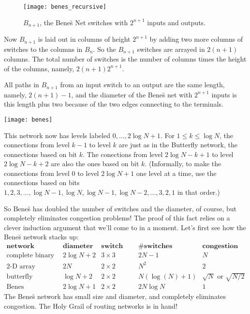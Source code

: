 \begin{figure}
\texttt{[image: benes\_recursive]}
\caption{$B_{n+1}$, the Bene\u{s} Net switches with $2^{n+1}$ inputs
and outputs.}
\label{fig:benes-recursive}
\end{figure}

Now $B_{n+1}$ is laid out in columns of height $2^{n+1}$ by adding two
more columns of switches to the columns in $B_n$.  So the $B_{n+1}$
switches are arrayed in $2(n+1)$ columns.  The total number of
switches is the number of columns times the height of the columns,
namely, $2(n+1)2^{n+1}$.

All paths in $B_{n+1}$ from an input switch to an output are the same
length, namely, $2(n+1)-1$, and the diameter of the Bene\u{s} net with
$2^{n+1}$ inputs is this length plus two because of the two edges
connecting to the terminals.

\begin{editingnotes}

\texttt{[image: benes]}


This network now has levels labeled $0,\dots ,2 \log N + 1$. For $1 \leq k
\leq \log N$, the connections from level $k-1$ to level $k$ are just as in
the Butterfly network, the connections based on bit $k$. The conections
from level $2 \log N - k + 1$ to level $2 \log N - k + 2$ are also the
ones based on bit $k$.  (Informally, to make the connections from level
$0$ to level $2 \log N +1$ one level at a time, use the connections based
on bits $1,2,3,\dots, \log N - 1, \log N, \log N - 1, \log N - 2, \dots,
3,2,1$ in that order.)

\end{editingnotes}

So Bene\u{s} has doubled the number of switches and the diameter, of
course, but completely eliminates congestion problems!  The proof of
this fact relies on a clever induction argument that we'll come to in
a moment.  Let's first see how the Bene\u{s} network stacks up:
%
\[
\begin{array}{r|c|c|c|c}
\textbf{network} &
\textbf{diameter} &
\textbf{switch size} &
\textbf{\# switches} &
\textbf{congestion} \\ \hline
\text{complete binary tree} & 2 \log N + 2 & 3 \times 3 & 2N - 1 & N \\
\text{2-D array} & 2 N & 2 \times 2 & N^2 & 2 \\
\text{butterfly} & \log N + 2 & 2 \times 2 & N (\log(N) + 1) & \sqrt{N} \text{ or } \sqrt{N/2} \\
\text{Bene\u{s}} & 2 \log N + 1 & 2 \times 2 &  2 N \log N & 1
\end{array}
\]
%
The Bene\u{s} network has small size and diameter, and completely
eliminates congestion.  The Holy Grail of routing networks is in hand!


